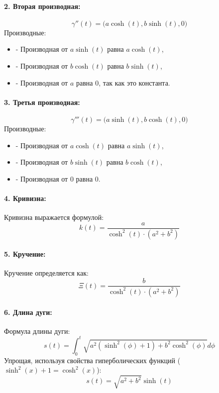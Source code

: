 \documentclass{article}
\begin{document}
        \paragraph{2. Вторая производная:}
        \[
        \gamma''(t) = \big(a \cosh(t), b \sinh(t), 0\big)
        \]
        Производные:
        \begin{itemize}
            \item - Производная от \(a \sinh(t)\) равна \(a \cosh(t)\),
            \item - Производная от \(b \cosh(t)\) равна \(b \sinh(t)\),
            \item - Производная от \(a\) равна \(0\), так как это константа.
        \end{itemize}
        
        \paragraph{3. Третья производная:}
        \[
        \gamma'''(t) = \big(a \sinh(t), b \cosh(t), 0\big)
        \]
        Производные:
        \begin{itemize}
            \item - Производная от \(a \cosh(t)\) равна \(a \sinh(t)\),
            \item - Производная от \(b \sinh(t)\) равна \(b \cosh(t)\),
            \item - Производная от \(0\) равна \(0\).
        \end{itemize}
        
        \paragraph{4. Кривизна:}
        Кривизна выражается формулой:
        \[
        k(t) = \frac{a}{\cosh^2(t) \cdot (a^2 + b^2)}
        \]  
        \paragraph{5. Кручение:}
        Кручение определяется как:
        \[
        \Xi(t) = \frac{b}{\cosh^2(t) \cdot (a^2 + b^2)}
        \]
    
        \paragraph{6. Длина дуги:}
        Формула длины дуги:
        \[
        s(t) = \int_{0}^{t} \sqrt{a^2 (\sinh^2(\phi) + 1) + b^2 \cosh^2(\phi)} d\phi
        \]
        Упрощая, используя свойства гиперболических функций (\(\sinh^2(x) + 1 = \cosh^2(x)\)):
        \[
        s(t) = \sqrt{a^2 + b^2} \sinh(t)
        \]
        
\end{document}
